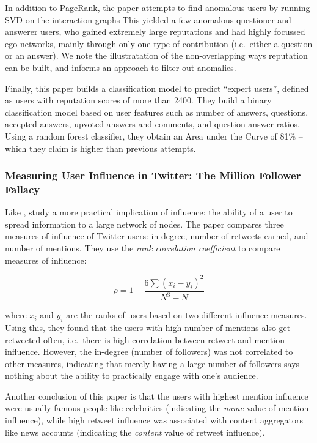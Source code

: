 \documentclass[10pt]{article}
\begin{document}
In addition to PageRank, the paper attempts to find anomalous users by running
SVD on the interaction graphs This yielded a few anomalous questioner and
answerer users, who gained extremely large reputations and had highly focussed
ego networks, mainly through only one type of contribution (i.e.\ either a
question or an answer). We note the illustratation of the non-overlapping ways
reputation can be built, and informs an approach to filter out anomalies.

Finally, this paper builds a classification model to predict ``expert users'',
defined as users with reputation scores of more than 2400. They build a
binary classification model based on user features such as number of answers,
questions, accepted answers, upvoted answers and comments, and question-answer
ratios. Using a random forest classifier, they obtain an Area
under the Curve of 81\% -- which they claim is higher than previous attempts.


\subsubsection{Measuring User Influence in Twitter: The Million Follower Fallacy
  \citep{cha2010measuring}}

Like \cite{bakshy2011everyone}, \citet{cha2010measuring} study a more practical
implication of influence: the ability of a user to spread information to a
large network of nodes. The paper compares three measures of influence of
Twitter users: in-degree, number of retweets earned, and number of mentions.
They use the \textit{rank correlation coefficient} to compare measures of
influence:

\begin{equation}
  \rho = 1 - \frac{6\sum{(x_i - y_i)^2}}{N^3 - N}
\end{equation}

where $x_i$ and $y_i$ are the ranks of users based on two different influence
measures. Using this, they found that the users with high number of mentions
also get retweeted often, i.e.\ there is high correlation between retweet and
mention influence. However, the in-degree (number of followers) was not
correlated to other measures, indicating that merely having a large number of
followers says nothing about the ability to practically engage with one's
audience.

Another conclusion of this paper is that the users with highest mention
influence were usually famous people like celebrities (indicating the
\emph{name} value of mention influence), while high retweet influence was
associated with content aggregators like news accounts (indicating the
\emph{content} value of retweet influence).
\end{document}
